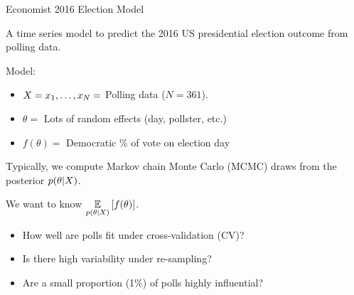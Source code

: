 
\begin{frame}{Economist 2016 Election Model \citep{economist:2020:election}}

\begin{minipage}[t]{0.4\textwidth}
    \ElectionData{}
\end{minipage}
\begin{minipage}[t]{0.59\textwidth}

A time series model to predict the 2016 US presidential election
outcome from polling data.

\spskip
Model:
\begin{itemize}
\item $X = x_1, \ldots, x_N =$ Polling data ($N = 361$).
\item $\theta = $ Lots of random effects (day, pollster, etc.)
\item $f(\theta) = $ Democratic \% of vote on election day
\end{itemize}

\spskip
Typically, we compute Markov chain Monte Carlo (MCMC) draws from the
posterior $p(\theta \vert X)$.

\spskip
We want to know $\underset{p(\theta \vert X)}{\mathbb{E}}\left[f(\theta)\right]$.

\end{minipage}




\begin{itemize}
    \item<2-> How well are polls fit under cross-validation (CV)? \citep{vehtari:2012:bayesianpredictivemodelassessment}
    \item<3-> Is there high variability under re-sampling?
    \citep{huggins:2023:bayesbag}
    \item<4-> Are a small proportion (1\%) of polls
    highly influential?
    \citep{broderick:2020:automatic}
\end{itemize}


\end{frame}





